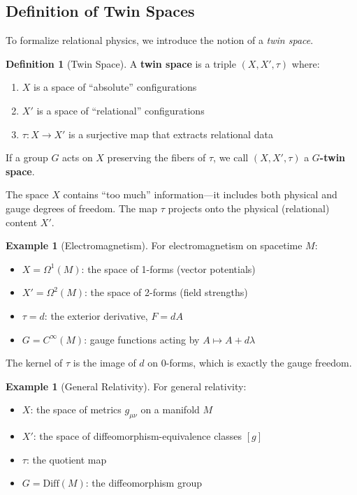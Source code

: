 \documentclass[11pt,a4paper,openright]{book}
\theoremstyle{plain}
\theoremstyle{definition}
\newtheorem{definition}[theorem]{Definition}
\newtheorem{example}[theorem]{Example}
\begin{document}
\subsection{Definition of Twin Spaces}

To formalize relational physics, we introduce the notion of a \emph{twin space}.

\begin{definition}[Twin Space]
\label{def:twin-space-ch1}
A \textbf{twin space} is a triple $(X, X', \tau)$ where:
\begin{enumerate}[label=(\roman*)]
    \item $X$ is a space of ``absolute'' configurations
    \item $X'$ is a space of ``relational'' configurations  
    \item $\tau: X \to X'$ is a surjective map that extracts relational data
\end{enumerate}
If a group $G$ acts on $X$ preserving the fibers of $\tau$, we call $(X, X', \tau)$ a \textbf{$G$-twin space}.
\end{definition}

The space $X$ contains ``too much'' information---it includes both physical and gauge degrees of freedom. The map $\tau$ projects onto the physical (relational) content $X'$.

\begin{example}[Electromagnetism]
For electromagnetism on spacetime $M$:
\begin{itemize}
    \item $X = \Omega^1(M)$: the space of 1-forms (vector potentials)
    \item $X' = \Omega^2(M)$: the space of 2-forms (field strengths)
    \item $\tau = d$: the exterior derivative, $F = dA$
    \item $G = C^\infty(M)$: gauge functions acting by $A \mapsto A + d\lambda$
\end{itemize}
The kernel of $\tau$ is the image of $d$ on 0-forms, which is exactly the gauge freedom.
\end{example}

\begin{example}[General Relativity]
For general relativity:
\begin{itemize}
    \item $X$: the space of metrics $g_{\mu\nu}$ on a manifold $M$
    \item $X'$: the space of diffeomorphism-equivalence classes $[g]$
    \item $\tau$: the quotient map
    \item $G = \mathrm{Diff}(M)$: the diffeomorphism group
\end{itemize}
\end{example}
\end{document}
